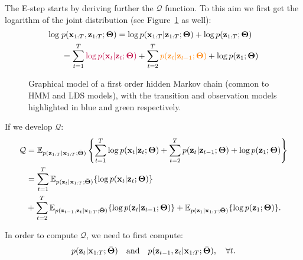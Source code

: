 The E-step starts by deriving further the $\mathcal{Q}$ function. To this aim we first get the logarithm of the joint distribution (see Figure~\ref{fig:lds} as well):
 \begin{align}
  \log\; &p(\bs{x}_{1:T},\bs{z}_{1:T};\bs{\Theta}) = \log p(\bs{x}_{1:T}|\bs{z}_{1:T};\bs{\Theta}) + \log p(\bs{z}_{1:T};\bs{\Theta}) \\
  &= \sum_{t=1}^T {\color{purple}\log p(\bs{x}_t|\bs{z}_t;\bs{\Theta})} + \sum_{t=2}^T {\color{orange}p(\bs{z}_t|\bs{z}_{t-1};\bs{\Theta})} + \log p(\bs{z}_1;\bs{\Theta})
 \end{align}
\begin{figure}[H]
    \centering
    \caption{Graphical model of a first order hidden Markov chain (common to HMM and LDS models), with the transition and observation models highlighted in blue and green respectively.\label{fig:lds}}
  \end{figure}
  
If we develop $\mathcal{Q}$:
  \begin{align}
   \mathcal{Q} &= \mathbb{E}_{p(\bs{z}_{1:T}|\bs{x}_{1:T};\bar{\bs{\Theta}})} \left\{ \sum_{t=1}^T \log p(\bs{x}_t|\bs{z}_t;\bs{\Theta}) + \sum_{t=2}^T p(\bs{z}_t|\bs{z}_{t-1};\bs{\Theta}) + \log p(\bs{z}_1;\bs{\Theta}) \right\} \\
   &= \sum_{t=1}^T \mathbb{E}_{p(\bs{z}_{t}|\bs{x}_{1:T};\bar{\bs{\Theta}})} \{\log p(\bs{x}_t|\bs{z}_t;\bs{\Theta})\}\\ &+ \sum_{t=2}^T\mathbb{E}_{p(\bs{z}_{t-1},\bs{z}_t|\bs{x}_{1:T};\bar{\bs{\Theta}})}\{ \log p(\bs{z}_t|\bs{z}_{t-1};\bs{\Theta})\} + \mathbb{E}_{p(\bs{z}_{1}|\bs{x}_{1:T};\bar{\bs{\Theta}})}\{\log p(\bs{z}_1;\bs{\Theta}) \}.
  \end{align}

In order to compute $\mathcal{Q}$, we need to first compute:
\begin{equation}
p(\bs{z}_t|\bs{x}_{1:T};\bar{\bs{\Theta}}) \quad\text{and}\quad p(\bs{z}_{t-1},\bs{z}_t|\bs{x}_{1:T};\bar{\bs{\Theta}}), \quad \forall t.
\end{equation}
 
